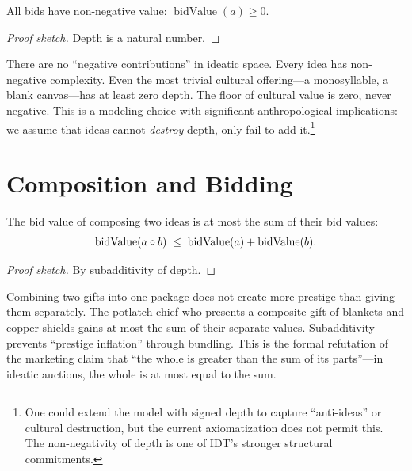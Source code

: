 \begin{theorem}
\label{thm:bid-nonneg}
All bids have non-negative value: $\operatorname{bidValue}(a) \ge 0$.
\end{theorem}

\begin{proof}[Proof sketch]
Depth is a natural number.
\end{proof}

There are no ``negative contributions'' in ideatic space.  Every idea has
non-negative complexity.  Even the most trivial cultural offering---a
monosyllable, a blank canvas---has at least zero depth.  The floor of
cultural value is zero, never negative.  This is a modeling choice with
significant anthropological implications: we assume that ideas cannot
\emph{destroy} depth, only fail to add it.\footnote{One could extend the
model with signed depth to capture ``anti-ideas'' or cultural
destruction, but the current axiomatization does not permit this.  The
non-negativity of depth is one of IDT's stronger structural commitments.}

\section{Composition and Bidding}
\label{sec:ch14-composition}

\begin{theorem}
\label{thm:composed-bid}
The bid value of composing two ideas is at most the sum of their bid values:
\[
  \operatorname{bidValue}(a \circ b)
  \;\le\;
  \operatorname{bidValue}(a) + \operatorname{bidValue}(b).
\]
\end{theorem}

\begin{proof}[Proof sketch]
By subadditivity of depth.
\end{proof}

Combining two gifts into one package does not create more prestige than
giving them separately.  The potlatch chief who presents a composite gift
of blankets and copper shields gains at most the sum of their separate
values.  Subadditivity prevents ``prestige inflation'' through bundling.
This is the formal refutation of the marketing claim that ``the whole is
greater than the sum of its parts''---in ideatic auctions, the whole is
at most equal to the sum.

